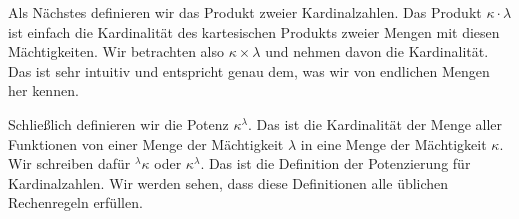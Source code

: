 \begin{math-stroke}
\end{math-stroke}

\begin{spoken-clean}[01:12:09 - 01:14:20]
Als Nächstes definieren wir das Produkt zweier Kardinalzahlen. Das Produkt $\kappa \cdot \lambda$ ist einfach die Kardinalität des kartesischen Produkts zweier Mengen mit diesen Mächtigkeiten. Wir betrachten also $\kappa \times \lambda$ und nehmen davon die Kardinalität. Das ist sehr intuitiv und entspricht genau dem, was wir von endlichen Mengen her kennen.
\end{spoken-clean}

\begin{spoken-clean}[01:14:20 - 01:16:39]
Schließlich definieren wir die Potenz $\kappa^\lambda$. Das ist die Kardinalität der Menge aller Funktionen von einer Menge der Mächtigkeit $\lambda$ in eine Menge der Mächtigkeit $\kappa$. Wir schreiben dafür ${}^\lambda \kappa$ oder $\kappa^\lambda$. Das ist die Definition der Potenzierung für Kardinalzahlen. Wir werden sehen, dass diese Definitionen alle üblichen Rechenregeln erfüllen.
\end{spoken-clean}

\begin{math-stroke}
\end{math-stroke}

